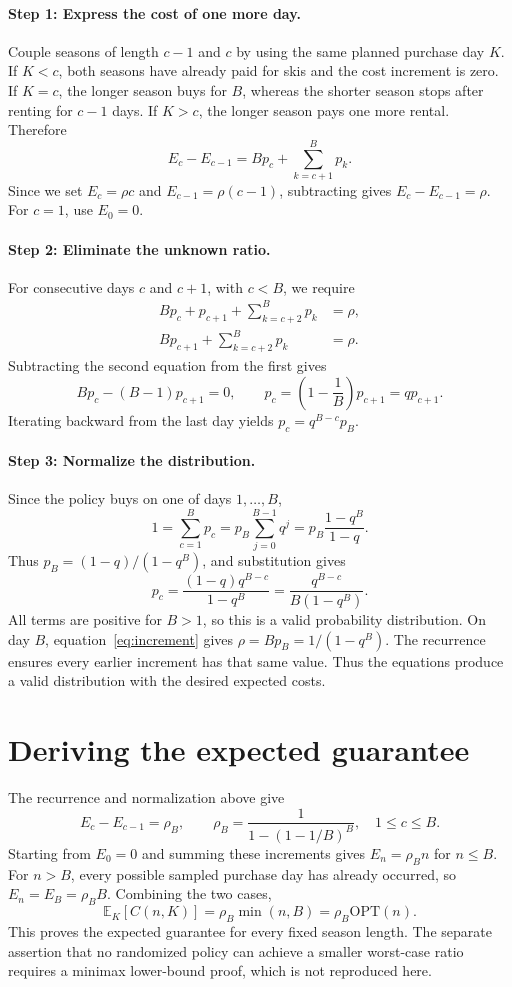 \documentclass[11pt]{article}
\begin{document}
\paragraph{Step 1: Express the cost of one more day.}
Couple seasons of length $c-1$ and $c$ by using the same planned purchase day $K$. If $K<c$, both seasons have already paid for skis and the cost increment is zero. If $K=c$, the longer season buys for $B$, whereas the shorter season stops after renting for $c-1$ days. If $K>c$, the longer season pays one more rental. Therefore
\begin{equation}
E_c-E_{c-1}=Bp_c+\sum_{k=c+1}^B p_k.
\label{eq:increment}
\end{equation}
Since we set $E_c=\rho c$ and $E_{c-1}=\rho(c-1)$, subtracting gives $E_c-E_{c-1}=\rho$. For $c=1$, use $E_0=0$.

\paragraph{Step 2: Eliminate the unknown ratio.}
For consecutive days $c$ and $c+1$, with $c<B$, we require
\begin{align*}
Bp_c+p_{c+1}+\sum_{k=c+2}^B p_k&=\rho,\\
Bp_{c+1}+\sum_{k=c+2}^B p_k&=\rho.
\end{align*}
Subtracting the second equation from the first gives
\[
Bp_c-(B-1)p_{c+1}=0,
\qquad p_c=\left(1-\frac1B\right)p_{c+1}=q p_{c+1}.
\]
Iterating backward from the last day yields $p_c=q^{B-c}p_B$.

\paragraph{Step 3: Normalize the distribution.}
Since the policy buys on one of days $1,\ldots,B$,
\[
1=\sum_{c=1}^B p_c
=p_B\sum_{j=0}^{B-1}q^j
=p_B\frac{1-q^B}{1-q}.
\]
Thus $p_B=(1-q)/(1-q^B)$, and substitution gives
\[
\boxed{p_c=\frac{(1-q)q^{B-c}}{1-q^B}
=\frac{q^{B-c}}{B(1-q^B)}.}
\]
All terms are positive for $B>1$, so this is a valid probability distribution. On day $B$, equation~\eqref{eq:increment} gives $\rho=Bp_B=1/(1-q^B)$. The recurrence ensures every earlier increment has that same value. Thus the equations produce a valid distribution with the desired expected costs.

\section{Deriving the expected guarantee}
The recurrence and normalization above give
\[
E_c-E_{c-1}=\rho_B,\qquad
\rho_B=\frac1{1-(1-1/B)^B},\quad 1\le c\le B.
\]
Starting from $E_0=0$ and summing these increments gives $E_n=\rho_B n$ for $n\le B$. For $n>B$, every possible sampled purchase day has already occurred, so $E_n=E_B=\rho_BB$. Combining the two cases,
\[
\boxed{\mathbb E_K[C(n,K)]=\rho_B\min(n,B)
=\rho_B\mathrm{OPT}(n).}
\]
This proves the expected guarantee for every fixed season length. The separate assertion that no randomized policy can achieve a smaller worst-case ratio requires a minimax lower-bound proof, which is not reproduced here.
\end{document}
